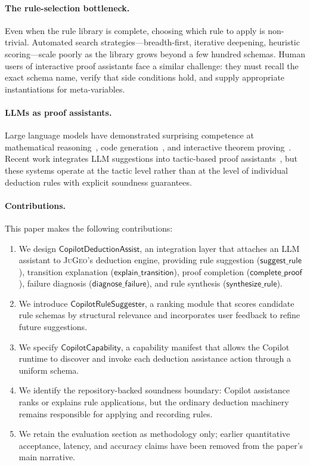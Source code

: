 \documentclass[11pt]{article}
\newcommand{\CDA}{\ensuremath{\mathsf{CopilotDeductionAssist}}}
\newcommand{\CRS}{\ensuremath{\mathsf{CopilotRuleSuggester}}}
\newcommand{\CC}{\ensuremath{\mathsf{CopilotCapability}}}
\newcommand{\JG}{\textsc{JuGeo}}
\newcommand{\LLM}{\textsc{LLM}}
\newcommand{\suggestRule}{\ensuremath{\mathsf{suggest\_rule}}}
\newcommand{\explainTrans}{\ensuremath{\mathsf{explain\_transition}}}
\newcommand{\completeProof}{\ensuremath{\mathsf{complete\_proof}}}
\newcommand{\diagnoseFailure}{\ensuremath{\mathsf{diagnose\_failure}}}
\newcommand{\synthesizeRule}{\ensuremath{\mathsf{synthesize\_rule}}}
\begin{document}
\paragraph{The rule-selection bottleneck.}
Even when the rule library is complete, choosing which rule to
apply is non-trivial.  Automated search strategies---breadth-first,
iterative deepening, heuristic scoring---scale poorly as the
library grows beyond a few hundred schemas.  Human users of
interactive proof assistants face a similar challenge: they must
recall the exact schema name, verify that side conditions hold, and
supply appropriate instantiations for meta-variables.

\paragraph{LLMs as proof assistants.}
Large language models have demonstrated surprising competence at
mathematical reasoning~\cite{polu2020gpt,lample2022hypertree},
code generation~\cite{chen2021codex}, and interactive theorem
proving~\cite{first2023baldur,yang2024leandojo}.  Recent work
integrates \LLM{} suggestions into tactic-based proof
assistants~\cite{thakur2024copra,song2024towards}, but these
systems operate at the tactic level rather than at the level of
individual deduction rules with explicit soundness guarantees.

\paragraph{Contributions.}
This paper makes the following contributions:
\begin{enumerate}
  \item We design \emph{$\CDA$}, an integration layer that
    attaches an \LLM{} assistant to \JG{}'s deduction engine,
    providing rule suggestion ($\suggestRule$), transition
    explanation ($\explainTrans$), proof completion
    ($\completeProof$), failure diagnosis ($\diagnoseFailure$),
    and rule synthesis ($\synthesizeRule$).

  \item We introduce \emph{$\CRS$}, a ranking module that scores
    candidate rule schemas by structural relevance and
    incorporates user feedback to refine future suggestions.

  \item We specify \emph{$\CC$}, a capability manifest that allows
    the Copilot runtime to discover and invoke each deduction
    assistance action through a uniform schema.

  \item We identify the repository-backed soundness boundary: Copilot
    assistance ranks or explains rule applications, but the ordinary
    deduction machinery remains responsible for applying and recording
    rules.

  \item We retain the evaluation section as methodology only; earlier
    quantitative acceptance, latency, and accuracy claims have been
    removed from the paper's main narrative.
\end{enumerate}
\end{document}
